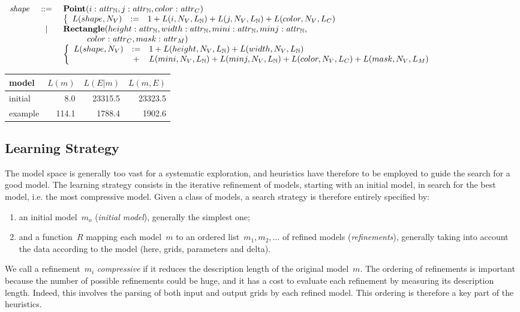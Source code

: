 \documentclass[a4paper]{llncs}
\newenvironment{datatype}{$\begin{array}{lcl}}{\end{array}$}
\newcommand{\is}{&\ ::=\ &}
\newcommand{\altis}{\\ &\ \mid\ &}
\newcommand{\baction}{\\ & & \left\{\begin{array}{lcl}}
\newcommand{\eaction}{\end{array}\right.}
\newcommand{\defby}{& := &}
\newcommand{\nat}{\mathbb{N}}
\begin{document}
\begin{datatype}
  {\it shape} \is {\bf Point}(i: {\it attr}_\nat, j: {\it attr}_\nat, color: {\it attr}_C)
  \baction
  L(shape,N_V) \defby 1 + L(i,N_V,L_\nat) + L(j,N_V,L_\nat) + L(color,N_V,L_C) \\
  \eaction
  \altis {\bf Rectangle}(height: {\it attr}_\nat, width: {\it attr}_\nat, mini: {\it attr}_\nat, minj: {\it attr}_\nat,\\
  & & \hspace*{1cm} color: {\it attr}_C, mask: {\it attr}_M)
  \baction
  L(shape,N_V) \defby 1 + L(height,N_V,L_\nat) + L(width,N_V,L_\nat) \\
  & + & L(mini,N_V,L_\nat) + L(minj,N_V,L_\nat) + L(color,N_V,L_C) + L(mask,N_V,L_M)
  \eaction
\end{datatype}

\begin{center}
  \begin{tabular}{|l|r|r|r|}
    \hline
    model & $L(m)$ & $L(E|m)$ & $L(m,E)$ \\
    \hline
    initial & 8.0 & 23315.5 & 23323.5 \\
    example & 114.1 & 1788.4 & 1902.6 \\
    \hline
  \end{tabular}
\end{center}


\subsection{Learning Strategy}

The model space is generally too vast for a systematic exploration,
and heuristics have therefore to be employed to guide the search for a
good model.
%
The learning strategy consists in the iterative refinement of models,
starting with an initial model, in search for the best model, i.e. the
most compressive model. Given a class of models, a search strategy is
therefore entirely specified by:
\begin{enumerate}
\item an initial model~$m_o$ ({\em initial model}), generally the
  simplest one;
\item and a function~$R$ mapping each model~$m$ to an ordered
  list~$m_1, m_2, \ldots$ of refined models ({\em refinements}),
  generally taking into account the data according to the model (here,
  grids, parameters and delta).
\end{enumerate}
We call a refinement~$m_i$ {\em compressive} if it reduces the
description length of the original model~$m$. The ordering of
refinements is important because the number of possible refinements
could be huge, and it has a cost to evaluate each refinement by
measuring its description length. Indeed, this involves the parsing of
both input and output grids by each refined model.  This ordering is
therefore a key part of the heuristics.
\end{document}

